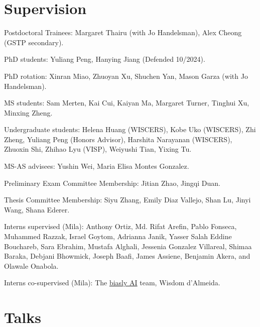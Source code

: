 \documentclass[letterpaper]{article}
\renewenvironment{itemize}{
  \begin{list}{}{
    \setlength{\leftmargin}{1.5em}
  }
}{
  \end{list}
}
\begin{document}
\section*{Supervision}
\begin{itemize}
\item Postdoctoral Trainees: Margaret Thairu (with Jo Handelsman), Alex Cheong (GSTP secondary).
\item PhD students: Yuliang Peng, Hanying Jiang (Defended 10/2024).
\item PhD rotation: Xinran Miao, Zhuoyan Xu, Shuchen Yan, Mason Garza (with Jo Handelsman).
\item MS students: Sam Merten, Kai Cui, Kaiyan Ma, Margaret Turner, Tinghui Xu, Minxing Zheng.
\item Undergraduate students: Helena Huang (WISCERS), Kobe Uko (WISCERS), Zhi
Zheng, Yuliang Peng (Honors Advisor), Harshita Narayanan (WISCERS), Zhuoxin Shi,
Zhihao Lyu (VISP), Weiyushi Tian, Yixing Tu.
\item MS-AS advisees: Yushin Wei, Maria Elisa Montes Gonzalez.
\item Preliminary Exam Committee Membership: Jitian Zhao, Jingqi Duan.
\item Thesis Committee Membership: Siyu Zhang, Emily Diaz Vallejo, Shan Lu,
Jinyi Wang, Shana Ederer.
\item Interns supervised (Mila): Anthony Ortiz, Md. Rifat Arefin, Pablo Fonseca,
  Muhammed Razzak, Israel Goytom, Adrianna Janik, Yasser Salah Eddine Bouchareb,
  Sara Ebrahim, Mustafa Alghali, Jessenia Gonzalez Villareal, Shimaa Baraka,
  Debjani Bhowmick, Joseph Baafi, James Assiene, Benjamin Akera, and Olawale
  Onabola.
\item Interns co-supervised (Mila): The
\href{https://sites.google.com/view/biaslyai/home}{biasly AI} team, Wisdom
d'Almeida.
\end{itemize}

\section*{Talks}
\end{document}
